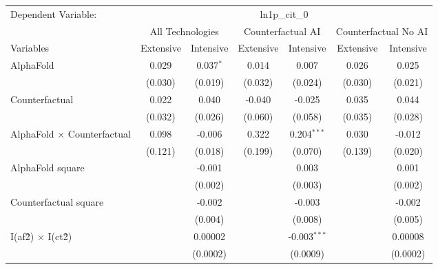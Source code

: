 \begingroup
\centering
\begin{tabular}{lcccccc}
   \tabularnewline \midrule \midrule
   Dependent Variable: & \multicolumn{6}{c}{ln1p\_cit\_0}\\
 & \multicolumn{2}{c}{All Technologies} & \multicolumn{2}{c}{Counterfactual AI} & \multicolumn{2}{c}{Counterfactual No AI} \\
\cmidrule(lr){1-1}\cmidrule(lr){2-3} \cmidrule(lr){4-5} \cmidrule(lr){6-7}
Variables & \multicolumn{1}{c}{Extensive} & \multicolumn{1}{c}{Intensive} & \multicolumn{1}{c}{Extensive} & \multicolumn{1}{c}{Intensive} & \multicolumn{1}{c}{Extensive} & \multicolumn{1}{c}{Intensive} \\
\cmidrule(lr){1-1}\cmidrule(lr){2-2} \cmidrule(lr){3-3} \cmidrule(lr){4-4} \cmidrule(lr){5-5} \cmidrule(lr){6-6} \cmidrule(lr){7-7}
   AlphaFold                          & 0.029   & 0.037$^{*}$ & 0.014   & 0.007          & 0.026   & 0.025\\   
                                      & (0.030) & (0.019)     & (0.032) & (0.024)        & (0.030) & (0.021)\\   
   Counterfactual                     & 0.022   & 0.040       & -0.040  & -0.025         & 0.035   & 0.044\\   
                                      & (0.032) & (0.026)     & (0.060) & (0.058)        & (0.035) & (0.028)\\   
   AlphaFold $\times$ Counterfactual  & 0.098   & -0.006      & 0.322   & 0.204$^{***}$  & 0.030   & -0.012\\   
                                      & (0.121) & (0.018)     & (0.199) & (0.070)        & (0.139) & (0.020)\\   
   AlphaFold square                   &         & -0.001      &         & 0.003          &         & 0.001\\   
                                      &         & (0.002)     &         & (0.003)        &         & (0.002)\\   
   Counterfactual square              &         & -0.002      &         & -0.003         &         & -0.002\\   
                                      &         & (0.004)     &         & (0.008)        &         & (0.005)\\   
   I(af\^2) $\times$ I(ct\^2)         &         & 0.00002     &         & -0.003$^{***}$ &         & 0.00008\\   
                                      &         & (0.0002)    &         & (0.0009)       &         & (0.0002)\\   

\end{tabular}
